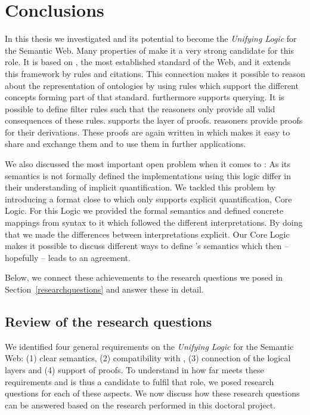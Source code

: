 \chapter{Conclusions}\label{concl}\label{conclusion}
In this thesis we investigated  \nthreelogic and its potential to become the \emph{Unifying Logic} for the Semantic Web. 
Many properties of \nthree make it a very strong candidate for this role.
It is based on \rdf, the most established standard of the Web, and it extends this framework by rules and citations. This connection makes it possible to reason 
about the \rdf representation of \owl ontologies by using rules which support the different concepts forming part of that standard. 
\nthree furthermore supports querying. It is possible to define filter rules such that the reasoners only provide all valid consequences of these rules. \nthree supports the layer 
of proofs. \nthree reasoners provide proofs for their derivations. These proofs are again written in \nthree which makes it easy to share and exchange them and 
to use them in further applications.

We also discussed the most important open problem when it comes to \nthree:  As its semantics is not formally defined the implementations using this 
logic differ in their understanding of implicit quantification. We tackled this problem by introducing a format close to \nthree which only supports explicit 
quantification, \nthree Core Logic. For this Logic we provided the formal semantics and defined concrete mappings from \nthree syntax to it which followed 
the different interpretations. By doing that we made the differences between interpretations explicit. Our \nthree Core Logic makes it possible to discuss 
different ways to define \nthree's semantics which then -- hopefully -- leads to an agreement.

Below, we connect these achievements to the research questions we posed in Section~\ref{researchquestions} and answer these in detail.


\section{Review of the research questions}
We identified four general
requirements on the \emph{Unifying Logic} for the Semantic Web: (1) clear semantics, %
(2) compatibility with \rdf, 
(3) connection of the logical layers 
and (4) support of proofs. To understand in how far \nthree meets these requirements and is thus a candidate to fulfil that role, we posed research questions for each of these aspects.
We now discuss how these research questions can be answered based on the research performed in this doctoral project.

